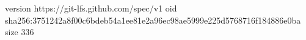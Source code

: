 version https://git-lfs.github.com/spec/v1
oid sha256:3751242a8f00c6bdeb54a1ee81e2a96ec98ae5999e225d5768716f184886e0ba
size 336
